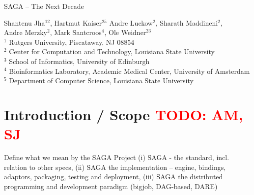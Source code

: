 \documentclass{article}
\newcommand{\B}[1]{\textbf{#1}}
\newcommand{\todo}[1]{{\textcolor{red}{\B{TODO:} #1 }}}
\begin{document}
\begin{center}
{\Large SAGA -- The Next Decade}
\end{center}

{\large
        Shantenu Jha$^{12}$,
        Hartmut Kaiser$^{25}$
        Andre Luckow$^{2}$,
        Sharath Maddineni$^{2}$,\\
        Andre Merzky$^{2}$,
        Mark Santcroos$^{4}$,
        Ole Weidner$^{23}$
        \\[1em]
        $^1$\tiny
         Rutgers University, 
         Piscataway, NJ 08854\\[-0.3em]
        $^2$ \tiny
          Center for Computation and Technology, 
          Louisiana State University\\[-0.3em]
        $^3$ \tiny
          School of Informatics, 
          University of Edinburgh \\[-0.3em]  
        $^4$ \tiny
         Bioinformatics Laboratory, Academic Medical Center, 
         University of Amsterdam\\[-0.3em]
        $^5$ \tiny
         Department of Computer Science, 
          Louisiana State University\\[-0.3em]
       }

\begin{abstract}
  "Never let the future disturb you. You will meet it, if you have to,
  with the same weapons of reason which today arm you against the
  present."  -- Marcus Aurelius Antoninus, 'Meditations' "Panta Rhei"
  -- that phrase is ever so true for human technology.  The last
  decade has seen that confirmed for distributed computing as for any
  other field of computing or technology in general.  While it is
  notoriously hard and error prone to predict the future, we dare a
  biased and limited (aka focused) glimpse into the expected evolution
  of our specific area of interest: programming abstractions for
  distributed scientific computing.
\end{abstract}


\section{Introduction / Scope \todo{AM, SJ}}


Define what we mean by the SAGA Project (i) SAGA - the standard,
incl. relation to other specs, (ii) SAGA the implementation -- engine,
bindings, adaptors, packaging, testing and deployment, (iii) SAGA the
distributed programming and development paradigm (bigjob, DAG-based,
DARE)
\end{document}
